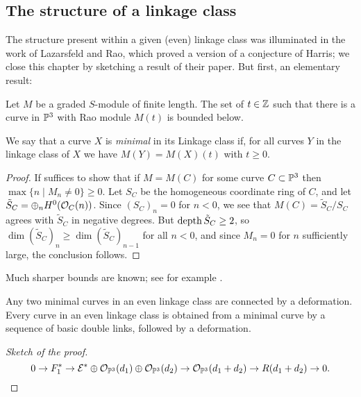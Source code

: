 \subsection{The structure of a linkage class}
The structure present within a given (even) linkage class was illuminated in the work of Lazarsfeld and Rao\cite{Laz-Rao}, which proved a version of a conjecture of Harris; we close this chapter by sketching a result of their paper. But first, an elementary result:

\begin{proposition} 
Let $M$ be a graded $S$-module of finite length. The set of $t\in\ZZ$ such that there is a curve in $\PP^3$ with Rao module
$M(t)$ is bounded below. 
\end{proposition}

We say that a curve $X$ is \emph{minimal} in its Linkage class if, for all curves $Y$ in the linkage class of $X$ we have
$M(Y) = M(X)(t)$ with $t\geq 0$.

\begin{proof} 
If suffices to show that if $M = M(C)$ for some curve $C\subset \PP^3$ then $\max\{n\mid M_n \neq 0\} \geq 0$. Let
$S_C$ be the homogeneous coordinate ring of $C$, and let $\tilde S_C = \oplus_n H^0(\sO_C(n))$. Since
$(S_C)_n = 0$ for $n<0$, we see that $M(C) = \tilde S_C/S_C$ agrees with $\tilde S_C$ in negative degrees. But
$\depth \tilde S_C\geq 2$, so $\dim (\tilde S_C)_n\geq \dim (\tilde S_C)_{n-1}$ for all $n<0$, and since $M_n=0$ for $n$ sufficiently
large, the conclusion follows.
\end{proof}

Much sharper bounds are known; see for example \cite{Perrin-Martin-Deschamps 1990}.

\begin{theorem}\label{Lazarsfeld-Rao}
Any two minimal curves in an even linkage class are connected by a deformation.
Every curve in an even linkage class is obtained from a minimal curve by a sequence of basic double links, followed by a deformation.
\end{theorem}

\begin{proof}[Sketch of the proof]
 $$
0\to F_1^* \to \sE^*\oplus \sO_{\PP^3}(d_1)\oplus \sO_{\PP^3}(d_2) \to \sO_{\PP^3}(d_1+d_2) \to R(d_1+d_2) \to 0.
$$

\end{proof}

